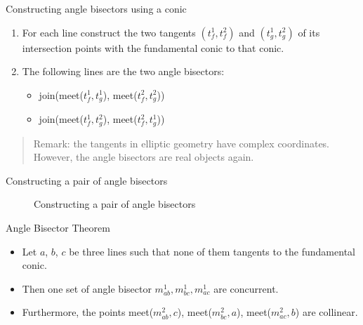 \documentclass[10pt,ignorenonframetext,serif,onlymath]{beamer}
\providecommand{\tightlist}{%
  \setlength{\itemsep}{0pt}\setlength{\parskip}{0pt}}
\begin{document}
\begin{frame}{Constructing angle bisectors using a conic}
\protect\hypertarget{sec:constructing-angle-bisectors-using-a-conic}{}

\begin{enumerate}
[1.]
\tightlist
\item
  For each line construct the two tangents \((t_f^1, t_f^2)\) and
  \((t_g^1, t_g^2)\) of its intersection points with the fundamental
  conic to that conic.
\item
  The following lines are the two angle bisectors:

  \begin{itemize}
  \tightlist
  \item
    join(meet(\(t_f^1, t_g^1\)), meet(\(t_f^2, t_g^2\)))
  \item
    join(meet(\(t_f^1, t_g^2\)), meet(\(t_f^2, t_g^1\)))
  \end{itemize}
\end{enumerate}

\begin{quote}
Remark: the tangents in elliptic geometry have complex coordinates.
However, the angle bisectors are real objects again.
\end{quote}

\end{frame}

\begin{frame}{Constructing a pair of angle bisectors}
\protect\hypertarget{sec:constructing-a-pair-of-angle-bisectors}{}

\begin{figure}[hp]
\centering

\caption{Constructing a pair of angle bisectors}
\label{fig:bisector}
\end{figure}

\end{frame}

\begin{frame}{Angle Bisector Theorem}
\protect\hypertarget{sec:angle-bisector-theorem}{}

\begin{itemize}
\item
  Let \(a\), \(b\), \(c\) be three lines such that none of them tangents
  to the fundamental conic.
\item
  Then one set of angle bisector \(m^1_{ab}, m^1_{bc}, m^1_{ac}\) are
  concurrent.
\item
  Furthermore, the points meet(\(m^2_{ab}, c\)), meet(\(m^2_{bc}, a\)),
  meet(\(m^2_{ac}, b\)) are collinear.
\end{itemize}

\end{frame}
\end{document}
